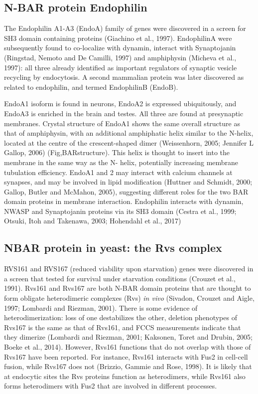 	\subsection{N-BAR protein Endophilin }	
The Endophilin A1-A3 (EndoA) family of genes were discovered in a screen for SH3 domain containing proteins (Giachino et al., 1997). EndophilinA were subsequently found to co-localize with dynamin, interact with Synaptojanin (Ringstad, Nemoto and De Camilli, 1997) and amphiphysin (Micheva et al., 1997): all three already identified as important regulators of synaptic vesicle recycling by endocytosis. A second mammalian protein was later discovered as related to endophilin, and termed EndophilinB (EndoB). 

	\vspace{5mm}
EndoA1 isoform is found in neurons, EndoA2 is expressed ubiquitously, and EndoA3 is enriched in the brain and testes. All three are found at presynaptic membranes. Crystal structure of EndoA1 shows the same overall structure as that of amphiphysin, with an additional amphiphatic helix similar to the N-helix, located at the centre of the crescent-shaped dimer (Weissenhorn, 2005; Jennifer L Gallop, 2006) (Fig,BARstructure). This helix is thought to insert into the membrane in the same way as the N- helix, potentially increasing membrane tubulation efficiency. EndoA1 and 2 may interact with calcium channels at synapses, and may be involved in lipid modification (Huttner and Schmidt, 2000; Gallop, Butler and McMahon, 2005), suggesting different roles for the two BAR domain proteins in membrane interaction. Endophilin interacts with dynamin, NWASP and Synaptojanin proteins via its SH3 domain (Cestra et al., 1999; Otsuki, Itoh and Takenawa, 2003; Hohendahl et al., 2017)





	\subsection{NBAR protein in yeast: the Rvs complex}		
RVS161 and RVS167 (reduced viability upon starvation) genes were discovered in a screen that tested for survival under starvation conditions (Crouzet et al., 1991). Rvs161 and Rvs167 are both N-BAR domain proteins that are thought to form obligate heterodimeric complexes (Rvs) \textit{in vivo} (Sivadon, Crouzet and Aigle, 1997; Lombardi and Riezman, 2001). There is some evidence of heterodimerization: loss of one destabilizes the other, deletion phenotypes of Rvs167 is the same as that of Rvs161, and FCCS measurements indicate that they dimerize (Lombardi and Riezman, 2001; Kaksonen, Toret and Drubin, 2005; Boeke et al., 2014). However, Rvs161 functions that do not overlap with those of Rvs167 have been reported. For instance, Rvs161 interacts with Fus2 in cell-cell fusion, while Rvs167 does not (Brizzio, Gammie and Rose, 1998). It is likely that at endocytic sites the Rvs proteins function as heterodimers, while Rvs161 also forms heterodimers with Fus2 that are involved in different processes. 


